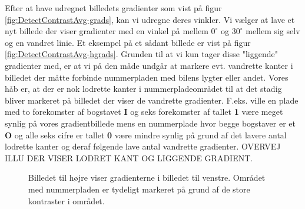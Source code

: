 Efter at have udregnet billedets gradienter som vist på figur \vref{fig:DetectContrastAvg-grads}, kan vi udregne deres vinkler. Vi vælger at lave et nyt billede der viser gradienter med en vinkel på mellem $0^{\circ}$ og $30^{\circ}$ mellem sig selv og en vandret linie. Et eksempel på et sådant billede er vist på figur \vref{fig:DetectContrastAvg-hgrads}. Grunden til at vi kun tager disse "liggende" gradienter med, er at vi på den måde undgår at markere evt. vandrette kanter i billedet der måtte forbinde nummerpladen med bilens lygter eller andet. Vores håb er, at der er nok lodrette kanter i nummerpladeområdet til at det stadig bliver markeret på billedet der viser de vandrette gradienter. F.eks. ville en plade med to forekomster af bogstavet \textbf{I} og seks forekomster af tallet \textbf{1} være meget synlig på vores gradientbillede mens en nummerplade hvor begge bogstaver er et \textbf{O} og alle seks cifre er tallet \textbf{0} være mindre synlig på grund af det lavere antal lodrette kanter og deraf følgende lave antal vandrette gradienter.
OVERVEJ ILLU DER VISER LODRET KANT OG LIGGENDE GRADIENT.
\begin{figure}[htbp]
  \centering
  \begin{minipage}[b]{5 cm}
  \end{minipage}
  \begin{minipage}[b]{5 cm}
  \end{minipage}
  \caption{Billedet til højre viser gradienterne i billedet til venstre. Området med nummerpladen er tydeligt markeret på grund af de store kontraster i området.}
  \label{fig:DetectContrastAvg-grads}
  \end{figure}

